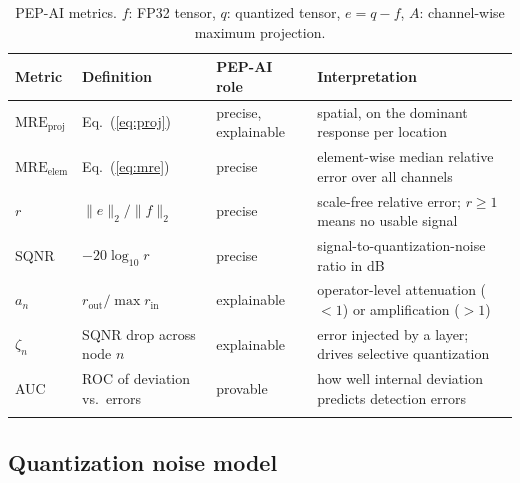 \documentclass[pdflatex,sn-mathphys-num]{sn-jnl}%
\theoremstyle{thmstyleone}%
\theoremstyle{thmstyletwo}%
\theoremstyle{thmstylethree}%
\begin{document}
\begin{table}[htbp]
\caption{PEP-AI metrics. $f$: FP32 tensor, $q$: quantized tensor, $e=q-f$, $A$: channel-wise maximum projection.}\label{tab:metrics}
\begin{tabular}{@{}lllp{4.3cm}@{}}
\toprule
Metric & Definition & PEP-AI role & Interpretation \\
\midrule
$\mathrm{MRE}_\mathrm{proj}$ & Eq.~(\ref{eq:proj}) & precise, explainable & spatial, on the dominant response per location \\
$\mathrm{MRE}_\mathrm{elem}$ & Eq.~(\ref{eq:mre}) & precise & element-wise median relative error over all channels \\
$r$ & $\lVert e\rVert_2/\lVert f\rVert_2$ & precise & scale-free relative error; $r\geq1$ means no usable signal \\
SQNR & $-20\log_{10} r$ & precise & signal-to-quantization-noise ratio in dB \\
$a_n$ & $r_\mathrm{out}/\max r_\mathrm{in}$ & explainable & operator-level attenuation ($<1$) or amplification ($>1$) \\
$\zeta_n$ & SQNR drop across node $n$ & explainable & error injected by a layer; drives selective quantization \\
AUC & ROC of deviation vs.\ errors & provable & how well internal deviation predicts detection errors \\
\botrule
\end{tabular}
\end{table}

\subsection{Quantization noise model}\label{sec:noise}
\end{document}
